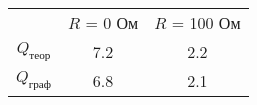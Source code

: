 \begin{tabular}{c|c|c}
\toprule
 & $R$ = 0 Ом & $R$ = 100 Ом \\
$Q_\text{теор}$ & 7.2 & 2.2 \\
$Q_\text{граф}$ & 6.8 & 2.1 \\
\bottomrule
\end{tabular}
